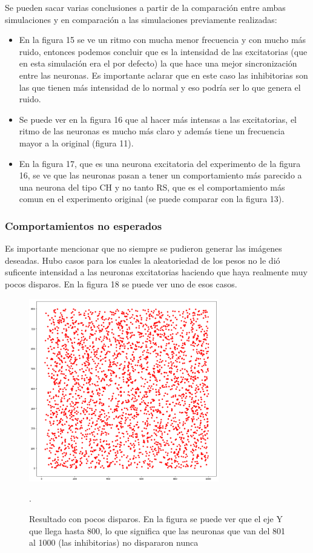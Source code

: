 \documentclass[12pt]{article}
\begin{document}
Se pueden sacar varias conclusiones a partir de la comparación entre ambas simulaciones y en comparación a las simulaciones previamente realizadas:
\begin{itemize}
    \item En la figura 15 se ve un ritmo con mucha menor frecuencia y con mucho más ruido, entonces podemos concluir que es la intensidad de las excitatorias (que en esta simulación era el por defecto)
    la que hace una mejor sincronización entre las neuronas. Es importante aclarar que en este caso las inhibitorias son las que tienen más intensidad de lo normal y eso podría ser lo que genera el ruido.
    \item Se puede ver en la figura 16 que al hacer más intensas a las excitatorias, el ritmo de las neuronas es mucho más claro y además tiene un frecuencia mayor a la original (figura 11).
    \item En la figura 17, que es una neurona excitatoria del experimento de la figura 16, se ve que las neuronas pasan a tener un comportamiento más parecido a una neurona del tipo CH y no tanto RS, que es el comportamiento más comun en el experimento original (se puede comparar con la figura 13).
\end{itemize}

\subsubsection{Comportamientos no esperados}
Es importante mencionar que no siempre se pudieron generar las imágenes deseadas. Hubo casos para los cuales la aleatoriedad de los pesos no le dió suficente intensidad a las neuronas excitatorias haciendo que haya realmente muy pocos disparos.
En la figura 18 se puede ver uno de esos casos.

\begin{figure}[htp!]
    \centering
        \includegraphics[height=8cm]{images/resultadoVacio.png}
    \caption[fontsize=2pt]{Resultado con pocos disparos. En la figura se puede ver que el eje Y que llega hasta 800, lo que significa que las neuronas que van del 801 al 1000 (las inhibitorias) no dispararon nunca}.
\end{figure}
\end{document}
